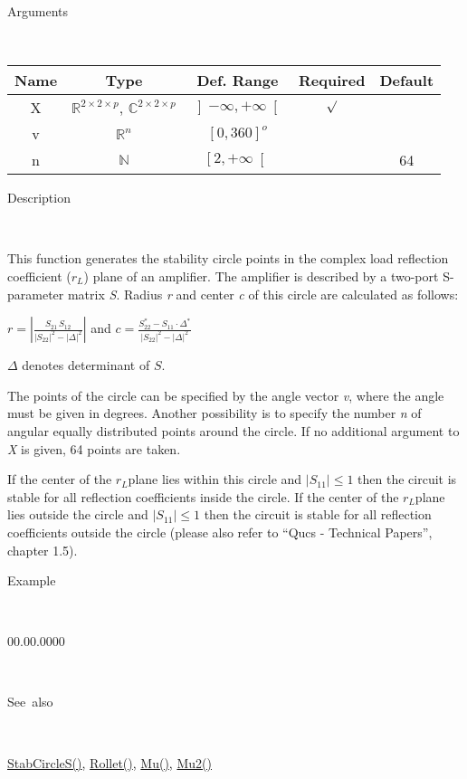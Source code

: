 \begin{description}
\item [Arguments]~
\end{description}
\begin{tabular}{|c|c|c|c|c|}
\hline 
Name&
Type&
Def. Range&
Required&
Default\tabularnewline
\hline
\hline 
X&
$\mathbb{R}^{2\times2\times p}$, $\mathbb{C}^{2\times2\times p}$&
$\left]-\infty,+\infty\right[$&
$\surd$&
\tabularnewline
\hline
v&
$\mathbb{R}^{n}$&
$\left[0,360\right]^{o}$&
&
\tabularnewline
\hline
n&
$\mathbb{N}$&
$\left[2,+\infty\right[$&
&
64\tabularnewline
\hline
\end{tabular}

\begin{description}
\item [Description]~
\end{description}
This function generates the stability circle points in the complex
load reflection coefficient ($r_{L}$) plane of an amplifier. The
amplifier is described by a two-port S-parameter matrix \textit{S}.
Radius \textit{r} and center \textit{c} of this circle are calculated
as follows:

\medskip{}
\noindent $r={\displaystyle \left|\frac{S_{21}\, S_{12}}{\left|S_{22}\right|^{2}-\left|\Delta\right|^{2}}\right|}$
and $c={\displaystyle \frac{S_{22}^{*}-S_{11}\cdot\Delta^{*}}{\left|S_{22}\right|^{2}-\left|\Delta\right|^{2}}}$
\medskip{}

$\Delta$ denotes determinant of $S$.

\noindent The points of the circle can be specified by the angle vector
\textit{v}, where the angle must be given in degrees. Another possibility
is to specify the number \textit{n} of angular equally distributed
points around the circle. If no additional argument to \textit{X}
is given, 64 points are taken.

\noindent If the center of the $r_{L}$plane lies within this circle
and $\left|S_{11}\right|\leq1$ then the circuit is stable for all
reflection coefficients inside the circle. If the center of the $r_{L}$plane
lies outside the circle and $\left|S_{11}\right|\leq1$ then the circuit
is stable for all reflection coefficients outside the circle (please
also refer to {}``Qucs - Technical Papers'', chapter 1.5).

\begin{description}
\item [Example]~
\end{description}
\begin{lyxlist}{00.00.0000}
\item [\texttt{v=StabCircleL(S)}]~
\end{lyxlist}
\begin{description}
\item [See~also]~
\end{description}
\textcolor{blue}{\hyperlink{StabCircleS}{StabCircleS()}}\textcolor{black}{,}
\textcolor{blue}{\hyperlink{Rollet}{Rollet()}}\textcolor{black}{,}
\textcolor{blue}{\hyperlink{Mu}{Mu()}}\textcolor{black}{,} \textcolor{blue}{\hyperlink{Mu2}{Mu2()}}


